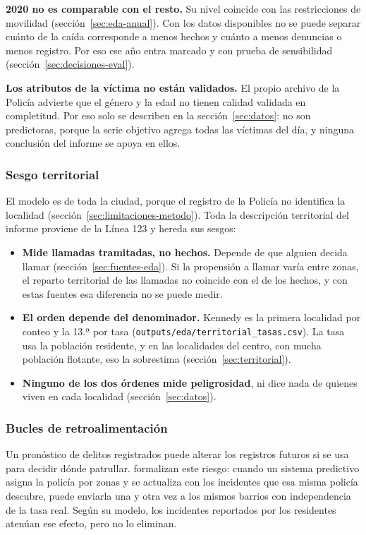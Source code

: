 \textbf{2020 no es comparable con el resto.} Su nivel coincide con las restricciones de movilidad (sección~\ref{sec:eda-anual}). Con los datos disponibles no se puede separar cuánto de la caída corresponde a menos hechos y cuánto a menos denuncias o menos registro. Por eso ese año entra marcado y con prueba de sensibilidad (sección~\ref{sec:decisiones-eval}).

\textbf{Los atributos de la víctima no están validados.} El propio archivo de la Policía advierte que el género y la edad no tienen calidad validada en completitud. Por eso solo se describen en la sección~\ref{sec:datos}: no son predictoras, porque la serie objetivo agrega todas las víctimas del día, y ninguna conclusión del informe se apoya en ellos.

\subsubsection{Sesgo territorial}

El modelo es de toda la ciudad, porque el registro de la Policía no identifica la localidad (sección~\ref{sec:limitaciones-metodo}). Toda la descripción territorial del informe proviene de la Línea 123 y hereda sus sesgos:
\begin{itemize}
  \item \textbf{Mide llamadas tramitadas, no hechos.} Depende de que alguien decida llamar (sección~\ref{sec:fuentes-eda}). Si la propensión a llamar varía entre zonas, el reparto territorial de las llamadas no coincide con el de los hechos, y con estas fuentes esa diferencia no se puede medir.
  \item \textbf{El orden depende del denominador.} Kennedy es la primera localidad por conteo y la 13.ª por tasa (\texttt{outputs/\allowbreak{}eda/\allowbreak{}territorial\_\allowbreak{}tasas.csv}). La tasa usa la población residente, y en las localidades del centro, con mucha población flotante, eso la sobrestima (sección~\ref{sec:territorial}).
  \item \textbf{Ninguno de los dos órdenes mide peligrosidad}, ni dice nada de quienes viven en cada localidad (sección~\ref{sec:datos}).
\end{itemize}

\subsubsection{Bucles de retroalimentación}

Un pronóstico de delitos registrados puede alterar los registros futuros si se usa para decidir dónde patrullar. \citet{ensign2018} formalizan este riesgo: cuando un sistema predictivo asigna la policía por zonas y se actualiza con los incidentes que esa misma policía descubre, puede enviarla una y otra vez a los mismos barrios con independencia de la tasa real. Según su modelo, los incidentes reportados por los residentes atenúan ese efecto, pero no lo eliminan.

